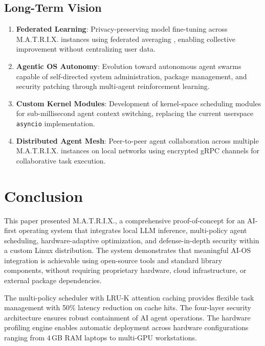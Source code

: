 \documentclass[conference]{IEEEtran}
\begin{document}
\subsection{Long-Term Vision}

\begin{enumerate}
    \item \textbf{Federated Learning}: Privacy-preserving model fine-tuning across M.A.T.R.I.X. instances using federated averaging \cite{mcmahan2017federated}, enabling collective improvement without centralizing user data.
    
    \item \textbf{Agentic OS Autonomy}: Evolution toward autonomous agent swarms capable of self-directed system administration, package management, and security patching through multi-agent reinforcement learning.
    
    \item \textbf{Custom Kernel Modules}: Development of kernel-space scheduling modules for sub-millisecond agent context switching, replacing the current userspace \texttt{asyncio} implementation.
    
    \item \textbf{Distributed Agent Mesh}: Peer-to-peer agent collaboration across multiple M.A.T.R.I.X. instances on local networks using encrypted gRPC channels for collaborative task execution.
\end{enumerate}


\section{Conclusion}
\label{sec:conclusion}

This paper presented M.A.T.R.I.X., a comprehensive proof-of-concept for an AI-first operating system that integrates local LLM inference, multi-policy agent scheduling, hardware-adaptive optimization, and defense-in-depth security within a custom Linux distribution. The system demonstrates that meaningful AI-OS integration is achievable using open-source tools and standard library components, without requiring proprietary hardware, cloud infrastructure, or external package dependencies.

The multi-policy scheduler with LRU-K attention caching provides flexible task management with 50\% latency reduction on cache hits. The four-layer security architecture ensures robust containment of AI agent operations. The hardware profiling engine enables automatic deployment across hardware configurations ranging from 4\,GB RAM laptops to multi-GPU workstations.
\end{document}

